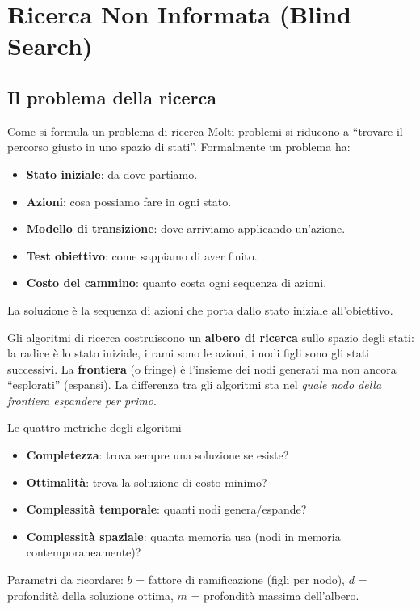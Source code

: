 \documentclass[12pt,a4paper]{article}
\begin{document}
\section{Ricerca Non Informata (Blind Search)}

\subsection{Il problema della ricerca}

\begin{narrativo}{Come si formula un problema di ricerca}
Molti problemi si riducono a ``trovare il percorso giusto in uno spazio di stati''. Formalmente un problema ha:
\begin{itemize}[noitemsep]
  \item \textbf{Stato iniziale}: da dove partiamo.
  \item \textbf{Azioni}: cosa possiamo fare in ogni stato.
  \item \textbf{Modello di transizione}: dove arriviamo applicando un'azione.
  \item \textbf{Test obiettivo}: come sappiamo di aver finito.
  \item \textbf{Costo del cammino}: quanto costa ogni sequenza di azioni.
\end{itemize}
La soluzione è la sequenza di azioni che porta dallo stato iniziale all'obiettivo.

Gli algoritmi di ricerca costruiscono un \textbf{albero di ricerca} sullo spazio degli stati: la radice è lo stato iniziale, i rami sono le azioni, i nodi figli sono gli stati successivi. La \textbf{frontiera} (o fringe) è l'insieme dei nodi generati ma non ancora ``esplorati'' (espansi). La differenza tra gli algoritmi sta nel \emph{quale nodo della frontiera espandere per primo}.
\end{narrativo}

\begin{ricorda}{Le quattro metriche degli algoritmi}
\begin{itemize}[noitemsep]
  \item \textbf{Completezza}: trova sempre una soluzione se esiste?
  \item \textbf{Ottimalità}: trova la soluzione di costo minimo?
  \item \textbf{Complessità temporale}: quanti nodi genera/espande?
  \item \textbf{Complessità spaziale}: quanta memoria usa (nodi in memoria contemporaneamente)?
\end{itemize}
Parametri da ricordare: $b$ = fattore di ramificazione (figli per nodo), $d$ = profondità della soluzione ottima, $m$ = profondità massima dell'albero.
\end{ricorda}
\end{document}
